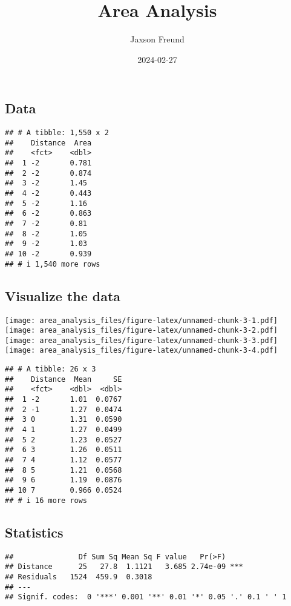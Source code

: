 \documentclass[
]{article}
\title{Area Analysis}
\author{Jaxson Freund}
\date{2024-02-27}
\begin{document}
\maketitle

\hypertarget{data}{%
\subsection{Data}\label{data}}

\begin{verbatim}
## # A tibble: 1,550 x 2
##    Distance  Area
##    <fct>    <dbl>
##  1 -2       0.781
##  2 -2       0.874
##  3 -2       1.45 
##  4 -2       0.443
##  5 -2       1.16 
##  6 -2       0.863
##  7 -2       0.81 
##  8 -2       1.05 
##  9 -2       1.03 
## 10 -2       0.939
## # i 1,540 more rows
\end{verbatim}

\hypertarget{visualize-the-data}{%
\subsection{Visualize the data}\label{visualize-the-data}}

\texttt{[image: area\_analysis\_files/figure-latex/unnamed-chunk-3-1.pdf]}
\texttt{[image: area\_analysis\_files/figure-latex/unnamed-chunk-3-2.pdf]}
\texttt{[image: area\_analysis\_files/figure-latex/unnamed-chunk-3-3.pdf]}
\texttt{[image: area\_analysis\_files/figure-latex/unnamed-chunk-3-4.pdf]}

\begin{verbatim}
## # A tibble: 26 x 3
##    Distance  Mean     SE
##    <fct>    <dbl>  <dbl>
##  1 -2       1.01  0.0767
##  2 -1       1.27  0.0474
##  3 0        1.31  0.0590
##  4 1        1.27  0.0499
##  5 2        1.23  0.0527
##  6 3        1.26  0.0511
##  7 4        1.12  0.0577
##  8 5        1.21  0.0568
##  9 6        1.19  0.0876
## 10 7        0.966 0.0524
## # i 16 more rows
\end{verbatim}

\hypertarget{statistics}{%
\subsection{Statistics}\label{statistics}}

\begin{verbatim}
##               Df Sum Sq Mean Sq F value   Pr(>F)    
## Distance      25   27.8  1.1121   3.685 2.74e-09 ***
## Residuals   1524  459.9  0.3018                     
## ---
## Signif. codes:  0 '***' 0.001 '**' 0.01 '*' 0.05 '.' 0.1 ' ' 1
\end{verbatim}
\end{document}
